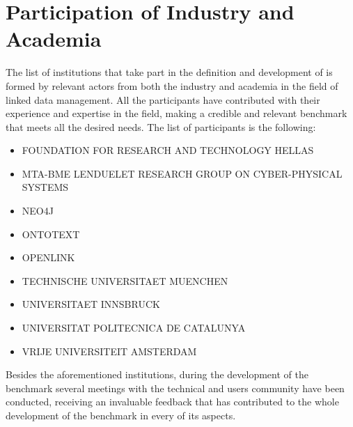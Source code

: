 \section{Participation of Industry and Academia}

The list of institutions that take part in the definition and development
of \ldbcsnb is formed by relevant actors from both the industry and academia in
the field of linked data management. All the participants have contributed with
their experience and expertise in the field, making a credible and relevant
benchmark that meets all the desired needs. The list of participants is the
following:

\begin{itemize}
    \item FOUNDATION FOR RESEARCH AND TECHNOLOGY HELLAS
    \item MTA-BME LENDUELET RESEARCH GROUP ON CYBER-PHYSICAL SYSTEMS
    \item NEO4J
    \item ONTOTEXT
    \item OPENLINK
    \item TECHNISCHE UNIVERSITAET MUENCHEN
    \item UNIVERSITAET INNSBRUCK
    \item UNIVERSITAT POLITECNICA DE CATALUNYA
    \item VRIJE UNIVERSITEIT AMSTERDAM
\end{itemize}

\begin{figure}
\end{figure}

Besides the aforementioned institutions, during the development of the
benchmark several meetings with the technical and users community have been
conducted, receiving an invaluable feedback that has contributed to the whole
development of the benchmark in every of its aspects.

